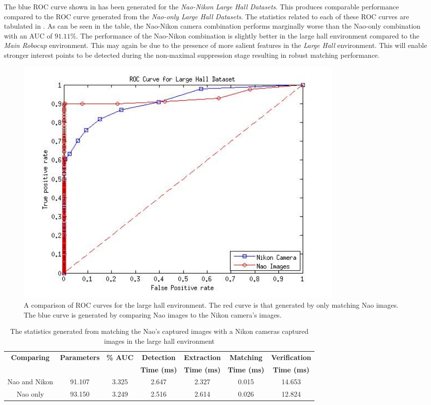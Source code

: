 The blue ROC curve shown in  has been generated for the \textit{Nao-Nikon Large Hall Datasets}. This produces comparable performance compared to the ROC curve generated from the \textit{Nao-only Large Hall Datasets}. The statistics related to each of these ROC curves are tabulated in . As can be seen in the table, the Nao-Nikon camera combination performs marginally worse than the Nao-only combination with an AUC of $91.11\%$. The performance of the Nao-Nikon combination is slightly better in the large hall environment compared to the \textit{Main Robocup} environment. This may again be due to the presence of more salient features in the \textit{Large Hall} environment. This will enable stronger interest points to be detected during the non-maximal suppression stage resulting in robust matching performance.\\ 


 \begin{figure}[h!] 
  \centering
    \includegraphics[width=0.8\textwidth]{../Drawings/camera/ROC_dataset3.jpg}
    \caption{A comparison of ROC curves for the large hall environment. The red curve is that generated by only matching Nao images. The blue curve is generated by comparing Nao images to the Nikon camera's images. }
    \label{fig:rocLargeHallNikon}
\end{figure}

\begin{table}
\centering
\caption{The statistics generated from matching the Nao's captured images with
a Nikon cameras captured images in the large hall environment}
\footnotesize
\begin{tabular}{|c|c|c|c|c|c|c|}
\hline 
\textbf{Comparing} & \textbf{Parameters} & \textbf{\% AUC} & \textbf{Detection} & \textbf{Extraction} & \textbf{Matching} & \textbf{Verification}\tabularnewline
 &  &  & \textbf{Time (ms)} & \textbf{Time (ms)} & \textbf{Time (ms)} & \textbf{Time (ms)}\tabularnewline
\hline 
\hline 
Nao and Nikon & 91.107 & 3.325 & 2.647 & 2.327 & 0.015 & 14.653\tabularnewline
\hline 
Nao only & 93.150 & 3.249 & 2.516 & 2.614 & 0.026 & 12.824\tabularnewline
\hline 
\end{tabular}
\label{tab:naoNikonLargeHall}
\end{table}

